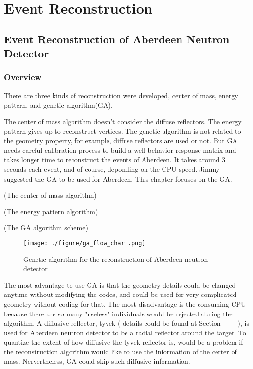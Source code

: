 \chapter {Event Reconstruction}
\section {Event Reconstruction of Aberdeen Neutron Detector}
\subsection {Overview}
There are three kinds of reconstruction were developed, center of mass,
energy pattern, and genetic algorithm(GA).

The center of mass algorithm doesn't consider the diffuse reflectors.
The energy pattern gives up to reconstruct vertices.
The genetic algorithm is not related to the geometry property, for example,
diffuse reflectors are used or not. But GA needs careful calibration process
to build a well-behavior response matrix and takes longer time to reconstruct
the events of Aberdeen. It takes around 3 seconds each event, and of course, deponding
on the CPU speed. Jimmy suggested the GA to be used for Aberdeen.
This chapter focuses on the GA.



(The center of mass algorithm)




(The energy pattern algorithm)




(The GA algorithm scheme)
\begin{figure}[h]
    \centering
    \texttt{[image: ./figure/ga\_flow\_chart.png]}
    \caption{Genetic algorithm for the reconstruction of Aberdeen neutron detector}
    \label{ga_flow_chart.png}
    \end{figure}


The most advantage to use GA is that the geometry details could be changed anytime without modifying the codes,
and could be used for very complicated geometry without coding for that. The most disadvantage is the consuming
CPU because there are so many "useless" individuals would be rejected during the algorithm.
A diffusive reflector, tyvek ( details could be found at Section--------), is used for Aberdeen neutron detector to
be a radial reflector around the target. To quantize the extent of how diffusive the tyvek reflector is, would be a problem
if the reconstruction algorithm would like to use the information of the certer of mass.
Nervertheless, GA could skip such diffusive information.


